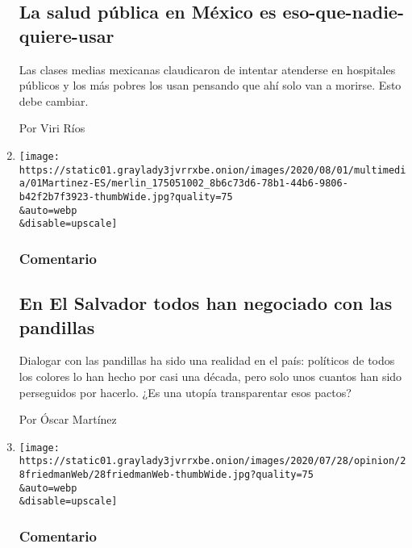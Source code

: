 \begin{enumerate}
  \hypertarget{la-salud-puxfablica-en-muxe9xico-es-eso-que-nadie-quiere-usar}{%
  \subsection{La salud pública en México es
  eso-que-nadie-quiere-usar}\label{la-salud-puxfablica-en-muxe9xico-es-eso-que-nadie-quiere-usar}}

  Las clases medias mexicanas claudicaron de intentar atenderse en
  hospitales públicos y los más pobres los usan pensando que ahí solo
  van a morirse. Esto debe cambiar.

  Por Viri Ríos
\item
  \href{/es/2020/08/02/espanol/opinion/pandillas-el-salvador.html}{}

  \texttt{[image: https://static01.graylady3jvrrxbe.onion/images/2020/08/01/multimedia/01Martinez-ES/merlin\_175051002\_8b6c73d6-78b1-44b6-9806-b42f2b7f3923-thumbWide.jpg?quality=75\\\&auto=webp\\\&disable=upscale]}

  \hypertarget{comentario-6}{%
  \subsubsection{Comentario}\label{comentario-6}}

  \hypertarget{en-el-salvador-todos-han-negociado-con-las-pandillas}{%
  \subsection{En El Salvador todos han negociado con las
  pandillas}\label{en-el-salvador-todos-han-negociado-con-las-pandillas}}

  Dialogar con las pandillas ha sido una realidad en el país: políticos
  de todos los colores lo han hecho por casi una década, pero solo unos
  cuantos han sido perseguidos por hacerlo. ¿Es una utopía transparentar
  esos pactos?

  Por Óscar Martínez
\item
  \href{/es/2020/07/30/espanol/opinion/usar-cubrebocas-politica.html}{}

  \texttt{[image: https://static01.graylady3jvrrxbe.onion/images/2020/07/28/opinion/28friedmanWeb/28friedmanWeb-thumbWide.jpg?quality=75\\\&auto=webp\\\&disable=upscale]}

  \hypertarget{comentario-7}{%
  \subsubsection{Comentario}\label{comentario-7}}


\end{enumerate}
